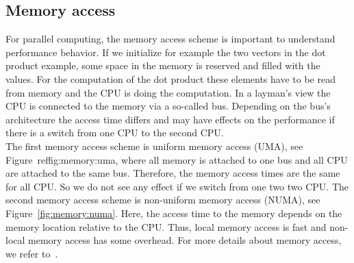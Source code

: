 \subsection*{Memory access}
For parallel computing, the memory access scheme is important to understand performance behavior. If we initialize for example the two vectors in the dot product example, some space in the memory is reserved and filled with the values. For the computation of the dot product these elements have to be read from memory and the CPU is doing the computation. In a layman's view the CPU is connected to the memory via a so-called bus. Depending on the bus's architecture the access time differs and may have effects on the performance if there is a switch from one CPU to the second CPU.\\

The first memory access scheme is uniform memory access (UMA), see Figure~ref{fig:memory:uma},  where all memory is attached to one bus and all CPU are attached to the same bus. Therefore, the memory access times are the same for all CPU. So we do not see any effect if we switch from one two two CPU. The second memory access scheme is non-uniform memory access (NUMA), see Figure~\ref{fig:memory:numa}. Here, the access time to the memory depends on the memory location relative to the CPU. Thus, local memory access is fast and non-local memory access has some overhead. For more details about memory access, we refer to~\cite{el2005advanced,hager2010introduction}.

